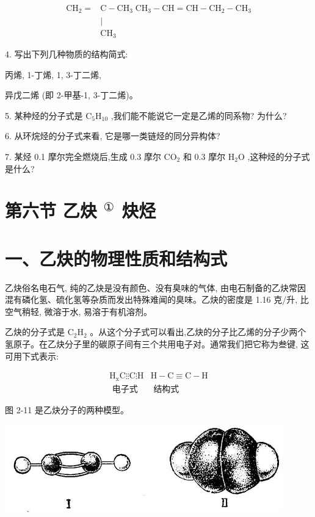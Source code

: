 \documentclass[10pt]{article}
\begin{document}
\[
\begin{aligned} {\mathrm{{CH}}}_{2} = & \mathrm{C} - {\mathrm{{CH}}}_{3}\;{\mathrm{{CH}}}_{3} - \mathrm{{CH}} = \mathrm{{CH}} - {\mathrm{{CH}}}_{2} - {\mathrm{{CH}}}_{3} \\ & \mid \\ & {\mathrm{{CH}}}_{3} \end{aligned}
\]

4. 写出下列几种物质的结构简式:

丙烯, 1-丁烯, 1, 3-丁二烯,

异戊二烯 (即 2-甲基-1, 3-丁二烯)。

5. 某种烃的分子式是 \({\mathrm{C}}_{5}{\mathrm{H}}_{10}\) ,我们能不能说它一定是乙烯的同系物? 为什么?

6. 从环烷烃的分子式来看, 它是哪一类链烃的同分异构体?

7. 某烃 0.1 摩尔完全燃烧后,生成 0.3 摩尔 \({\mathrm{{CO}}}_{2}\) 和 0.3 摩尔 \({\mathrm{H}}_{2}\mathrm{O}\) ,这种烃的分子式是什么?

\section*{第六节 乙炔 \({}^{\text{①}}\) 炔烃}

\section*{一、乙炔的物理性质和结构式}

乙炔俗名电石气, 纯的乙炔是没有颜色、没有臭味的气体, 由电石制备的乙炔常因混有磷化氢、硫化氢等杂质而发出特殊难闻的臭味。乙炔的密度是 1.16 克/升, 比空气稍轻, 微溶于水, 易溶于有机溶剂。

乙炔的分子式是 \({\mathrm{C}}_{2}{\mathrm{H}}_{2}\) 。从这个分子式可以看出,乙炔的分子比乙烯的分子少两个氢原子。在乙炔分子里的碳原子间有三个共用电子对。通常我们把它称为叁键, 这可用下式表示:

\[
\begin{matrix} {\mathrm{H}}_{\mathrm{x}}\mathrm{C}\vdots \vdots \mathrm{C}\vdots \mathrm{H} & \mathrm{H} - \mathrm{C} \equiv \mathrm{C} - \mathrm{H} \\ \text{ 电子式 } & \text{ 结构式 } \end{matrix}
\]

图 2-11 是乙炔分子的两种模型。

\begin{center}
\includegraphics[max width=0.9\textwidth]{images/01912d16-be99-77bb-9535-4f3ed8d9946f_77_300350.jpg}
\end{center}
\end{document}
